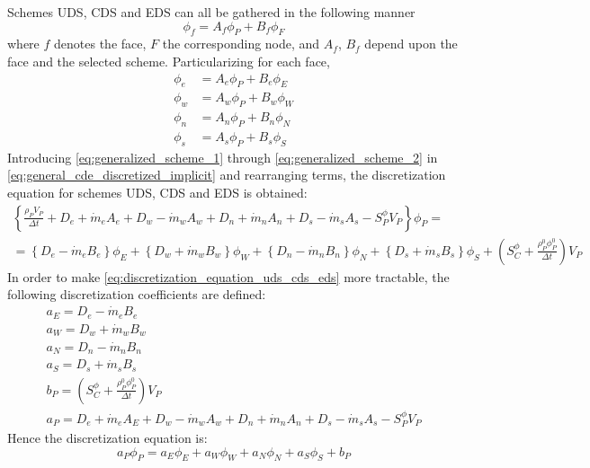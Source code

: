 Schemes UDS, CDS and EDS can all be gathered in the following manner
\begin{equation}
	\phi_f = A_f \phi_P + B_f \phi_F
\end{equation}
where $f$ denotes the face, $F$ the corresponding node, and $A_f$, $B_f$ depend upon the face and the selected scheme. Particularizing for each face,
\begin{align}
	\phi_e &= A_e \phi_P + B_e \phi_E \label{eq:generalized_scheme_1} \\ 
	\phi_w &= A_w \phi_P + B_w \phi_W \\ 
	\phi_n &= A_n \phi_P + B_n \phi_N \\ 
	\phi_s &= A_s \phi_P + B_s \phi_S \label{eq:generalized_scheme_2} 
\end{align}
Introducing \eqref{eq:generalized_scheme_1} through \eqref{eq:generalized_scheme_2} in \eqref{eq:general_cde_discretized_implicit} and rearranging terms, the discretization equation for schemes UDS, CDS and EDS is obtained:
\begin{multline} \label{eq:discretization_equation_uds_cds_eds}
	\left\{
	\frac{\rho_P V_P}{\Delta t} + 
	D_e + \dot{m}_e A_e + D_w - \dot{m}_w A_w + D_n + \dot{m}_n A_n + D_s - \dot{m}_s A_s - S_P^\phi V_P
	\right\} \phi_P = \\
	= 
	\left\{ D_e - \dot{m}_e B_e \right\} \phi_E + 
	\left\{ D_w + \dot{m}_w B_w \right\} \phi_W + 
	\left\{ D_n - \dot{m}_n B_n \right\} \phi_N + 
	\left\{ D_s + \dot{m}_s B_s \right\} \phi_S + 
	\left( S_C^\phi + \frac{\rho_P^0 \phi_P^0}{\Delta t} \right) V_P
\end{multline}
In order to make \eqref{eq:discretization_equation_uds_cds_eds} more tractable, the following discretization coefficients are defined:
\begin{gather}
	a_E = D_e - \dot{m}_e B_e \\
	a_W = D_w + \dot{m}_w B_w \\
	a_N = D_n - \dot{m}_n B_n \\
	a_S = D_s + \dot{m}_s B_s \\
	b_P = \left( S_C^\phi + \frac{\rho_P^0 \phi_P^0}{\Delta t} \right) V_P \\
	a_P = D_e + \dot{m}_e A_E + D_w - \dot{m}_w A_w + D_n + \dot{m}_n A_n + D_s - \dot{m}_s A_s - S_P^\phi V_P	
\end{gather}
Hence the discretization equation is:
\begin{equation}
	a_P \phi_P = a_E \phi_E + a_W \phi_W + a_N \phi_N + a_S \phi_S + b_P
\end{equation}


